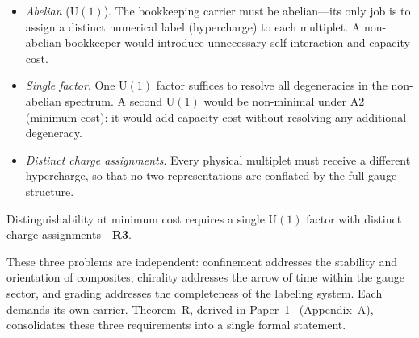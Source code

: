\documentclass[11pt]{article}
\newenvironment{varlist}{\begin{itemize}[nosep,leftmargin=2em]}{\end{itemize}}
\newcommand{\U}{\mathrm{U}}
\begin{document}
\begin{varlist}
\item \textit{Abelian} ($\U(1)$).  The bookkeeping carrier must be abelian---its only job is to assign a distinct numerical label (hypercharge) to each multiplet.  A non-abelian bookkeeper would introduce unnecessary self-interaction and capacity cost.
\item \textit{Single factor}.  One $\U(1)$ factor suffices to resolve all degeneracies in the non-abelian spectrum.  A second $\U(1)$ would be non-minimal under A2 (minimum cost): it would add capacity cost without resolving any additional degeneracy.
\item \textit{Distinct charge assignments}.  Every physical multiplet must receive a different hypercharge, so that no two representations are conflated by the full gauge structure.
\end{varlist}

\noindent Distinguishability at minimum cost requires a single $\U(1)$ factor with distinct charge assignments---\textbf{R3}.

\medskip
These three problems are independent: confinement addresses the stability and orientation of composites, chirality addresses the arrow of time within the gauge sector, and grading addresses the completeness of the labeling system.  Each demands its own carrier.  Theorem~R, derived in Paper~1~\cite{BrookePaper1} (Appendix~A), consolidates these three requirements into a single formal statement.
\end{document}
